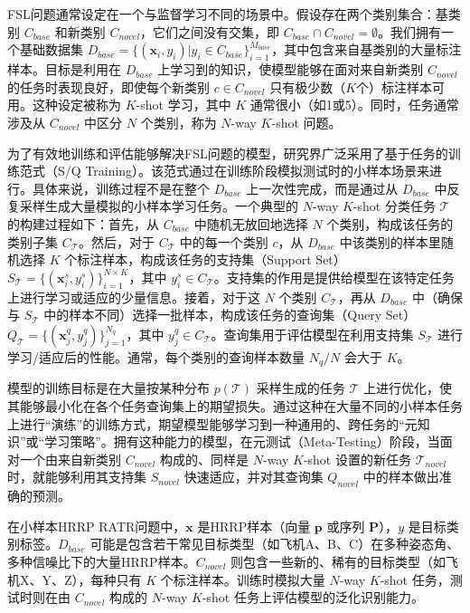 FSL问题通常设定在一个与监督学习不同的场景中。假设存在两个类别集合：基类别 $C_{base}$ 和新类别 $C_{novel}$，它们之间没有交集，即 $C_{base} \cap C_{novel} = \emptyset$。我们拥有一个基础数据集 $D_{base} = \{(\mathbf{x}_i, y_i) | y_i \in C_{base}\}_{i=1}^{M_{base}}$，其中包含来自基类别的大量标注样本。目标是利用在 $D_{base}$ 上学习到的知识，使模型能够在面对来自新类别 $C_{novel}$ 的任务时表现良好，即使每个新类别 $c \in C_{novel}$ 只有极少数（$K$个）标注样本可用。这种设定被称为 $K$-shot 学习，其中 $K$ 通常很小（如1或5）。同时，任务通常涉及从 $C_{novel}$ 中区分 $N$ 个类别，称为 $N$-way $K$-shot 问题。

为了有效地训练和评估能够解决FSL问题的模型，研究界广泛采用了基于任务的训练范式（S/Q Training）。该范式通过在训练阶段模拟测试时的小样本场景来进行。具体来说，训练过程不是在整个 $D_{base}$ 上一次性完成，而是通过从 $D_{base}$ 中反复采样生成大量模拟的小样本学习任务。一个典型的 $N$-way $K$-shot 分类任务 $\mathcal{T}$ 的构建过程如下：首先，从 $C_{base}$ 中随机无放回地选择 $N$ 个类别，构成该任务的类别子集 $C_{\mathcal{T}}$。然后，对于 $C_{\mathcal{T}}$ 中的每一个类别 $c$，从 $D_{base}$ 中该类别的样本里随机选择 $K$ 个标注样本，构成该任务的支持集（Support Set） $S_{\mathcal{T}} = \{(\mathbf{x}_i^s, y_i^s)\}_{i=1}^{N \times K}$，其中 $y_i^s \in C_{\mathcal{T}}$。支持集的作用是提供给模型在该特定任务上进行学习或适应的少量信息。接着，对于这 $N$ 个类别 $C_{\mathcal{T}}$，再从 $D_{base}$ 中（确保与 $S_{\mathcal{T}}$ 中的样本不同）选择一批样本，构成该任务的查询集（Query Set） $Q_{\mathcal{T}} = \{(\mathbf{x}_j^q, y_j^q)\}_{j=1}^{N_q}$，其中 $y_j^q \in C_{\mathcal{T}}$。查询集用于评估模型在利用支持集 $S_{\mathcal{T}}$ 进行学习/适应后的性能。通常，每个类别的查询样本数量 $N_q/N$ 会大于 $K$。

模型的训练目标是在大量按某种分布 $p(\mathcal{T})$ 采样生成的任务 $\mathcal{T}$ 上进行优化，使其能够最小化在各个任务查询集上的期望损失。通过这种在大量不同的小样本任务上进行“演练”的训练方式，期望模型能够学习到一种通用的、跨任务的“元知识”或“学习策略”。拥有这种能力的模型，在元测试（Meta-Testing）阶段，当面对一个由来自新类别 $C_{novel}$ 构成的、同样是 $N$-way $K$-shot 设置的新任务 $\mathcal{T}_{novel}$ 时，就能够利用其支持集 $S_{novel}$ 快速适应，并对其查询集 $Q_{novel}$ 中的样本做出准确的预测。

在小样本HRRP RATR问题中，$\mathbf{x}$ 是HRRP样本（向量 $\mathbf{p}$ 或序列 $\mathbf{P}$），$y$ 是目标类别标签。$D_{base}$ 可能是包含若干常见目标类型（如飞机A、B、C）在多种姿态角、多种信噪比下的大量HRRP样本。$C_{novel}$ 则包含一些新的、稀有的目标类型（如飞机X、Y、Z），每种只有 $K$ 个标注样本。训练时模拟大量 $N$-way $K$-shot 任务，测试时则在由 $C_{novel}$ 构成的 $N$-way $K$-shot 任务上评估模型的泛化识别能力。


